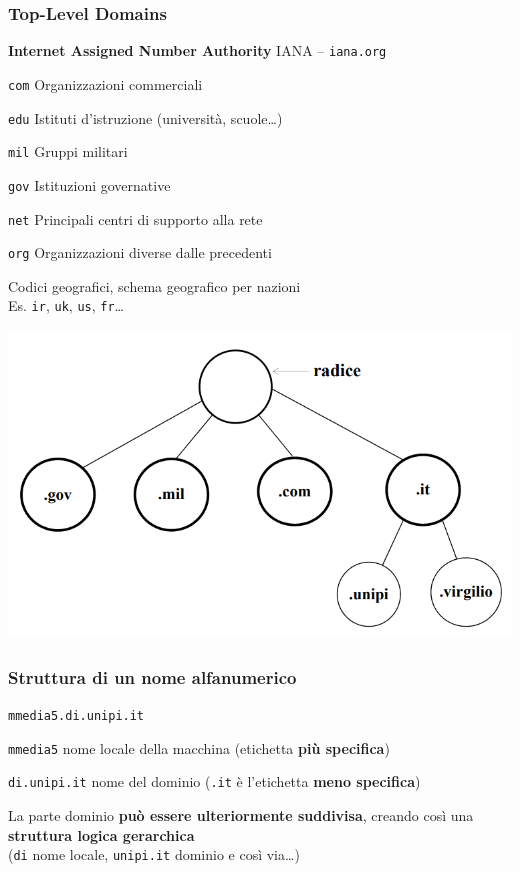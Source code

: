 \documentclass[10pt]{article}
\begin{document}
\subsubsection{Top-Level Domains}
\textbf{Internet Assigned Number Authority} IANA -- \texttt{iana.org}
\begin{list}{}{}
\item \texttt{com} Organizzazioni commerciali
\item \texttt{edu} Istituti d'istruzione (università, scuole\ldots)
\item \texttt{mil} Gruppi militari
\item \texttt{gov} Istituzioni governative
\item \texttt{net} Principali centri di supporto alla rete
\item \texttt{org} Organizzazioni diverse dalle precedenti
\item Codici geografici, schema geografico per nazioni\\Es. \texttt{ir}, \texttt{uk}, \texttt{us}, \texttt{fr}\ldots
\end{list}
\begin{center}
\includegraphics[scale=0.7]{gerarchianomidominio.png}
\end{center}
\subsubsection{Struttura di un nome alfanumerico}
\begin{center}
\texttt{mmedia5.di.unipi.it}
\end{center}
\begin{list}{}{}
\item \texttt{mmedia5} nome locale della macchina (etichetta \textbf{più specifica})
\item \texttt{di.unipi.it} nome del dominio (\texttt{.it} è l'etichetta \textbf{meno specifica})
\item La parte dominio \textbf{può essere ulteriormente suddivisa}, creando così una \textbf{struttura logica gerarchica}\\(\texttt{di} nome locale, \texttt{unipi.it} dominio e così via\ldots)
\end{list}
\pagebreak
\end{document}
